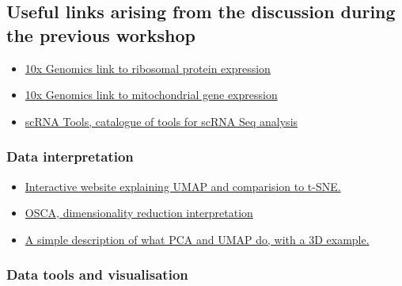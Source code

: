 \documentclass[
]{book}
\providecommand{\tightlist}{%
  \setlength{\itemsep}{0pt}\setlength{\parskip}{0pt}}
\begin{document}
\subsection{Useful links arising from the discussion during the previous workshop}\label{useful-links-arising-from-the-discussion-during-the-previous-workshop}

\begin{itemize}
\tightlist
\item
  \href{https://kb.10xgenomics.com/hc/en-us/articles/218169723-What-fraction-of-reads-map-to-ribosomal-proteins-}{10x Genomics link to ribosomal protein expression}
\item
  \href{https://kb.10xgenomics.com/hc/en-us/articles/360001086611-Why-do-I-see-a-high-level-of-mitochondrial-gene-expression-}{10x Genomics link to mitochondrial gene expression}
\item
  \href{https://www.scrna-tools.org/}{scRNA Tools, catalogue of tools for scRNA Seq analysis}
\end{itemize}

\subsubsection{Data interpretation}\label{data-interpretation}

\begin{itemize}
\tightlist
\item
  \href{https://pair-code.github.io/understanding-umap/}{Interactive website explaining UMAP and comparision to t-SNE.}
\item
  \href{http://bioconductor.org/books/3.14/OSCA.basic/dimensionality-reduction.html\#visualization-interpretation}{OSCA, dimensionality reduction interpretation}
\item
  \href{https://logarithmic.net/2023/dimred.html}{A simple description of what PCA and UMAP do, with a 3D example.}
\end{itemize}

\subsubsection{Data tools and visualisation}\label{data-tools-and-visualisation}
\end{document}
